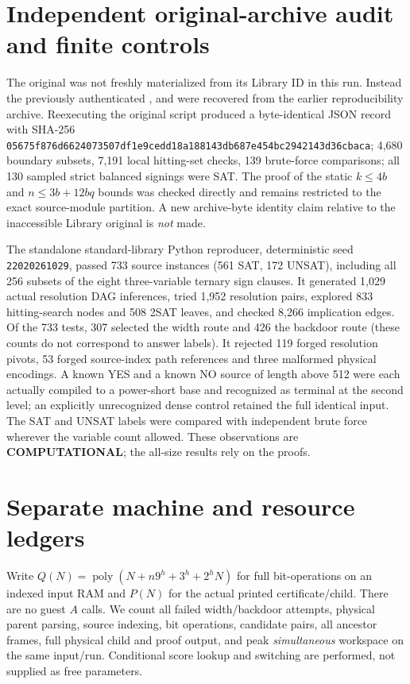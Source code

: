 \documentclass[11pt]{article}
\begin{document}
\section{Independent original-archive audit and finite controls}
The original  was not freshly materialized from its Library ID in this run. Instead the previously authenticated ,  and  were recovered from the earlier reproducibility archive. Reexecuting the original script produced a byte-identical JSON record with SHA-256 \texttt{05675f876d6624073507df1e9cedd18a188143db687e454bc2942143d36cbaca}; 4,680 boundary subsets, 7,191 local hitting-set checks, 139 brute-force comparisons; all 130 sampled strict balanced signings were SAT. The proof of the static $k\le4b$ and $n\le3b+12bq$ bounds was checked directly and remains restricted to the exact source-module partition. A new archive-byte identity claim relative to the inaccessible Library original is \emph{not} made.

The standalone standard-library Python reproducer, deterministic seed \texttt{22020261029}, passed 733 source instances (561 SAT, 172 UNSAT), including all 256 subsets of the eight three-variable ternary sign clauses. It generated 1,029 actual resolution DAG inferences, tried 1,952 resolution pairs, explored 833 hitting-search nodes and 508 2SAT leaves, and checked 8,266 implication edges. Of the 733 tests, 307 selected the width route and 426 the backdoor route (these counts do not correspond to answer labels). It rejected 119 forged resolution pivots, 53 forged source-index path references and three malformed physical encodings. A known YES and a known NO source of length above 512 were each actually compiled to a power-short base and recognized as terminal at the second level; an explicitly unrecognized dense control retained the full identical input. The SAT and UNSAT labels were compared with independent brute force wherever the variable count allowed. These observations are \textbf{COMPUTATIONAL}; the all-size results rely on the proofs.

\section{Separate machine and resource ledgers}
Write $Q(N)=\operatorname{poly}(N+n9^{h}+3^h+2^hN)$ for full bit-operations on an indexed input RAM and $P(N)$ for the actual printed certificate/child. There are no guest $A$ calls. We count all failed width/backdoor attempts, physical parent parsing, source indexing, bit operations, candidate pairs, all ancestor frames, full physical child and proof output, and peak \emph{simultaneous} workspace on the same input/run. Conditional score lookup and switching are performed, not supplied as free parameters.
\end{document}
